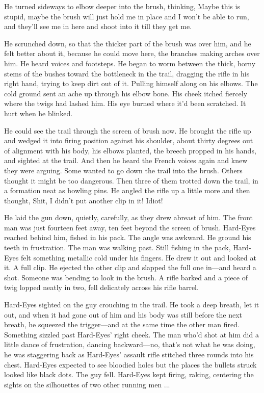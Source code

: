 He turned sideways to elbow deeper into the brush, thinking, Maybe this is stupid, maybe the brush will just hold me in place and I won't be able to run, and they'll see me in here and shoot into it till they get me.

He scrunched down, so that the thicker part of the brush was over him, and he felt better about it, because he could move here, the branches making arches over him. He heard voices and footsteps. He began to worm between the thick, horny stems of the bushes toward the bottleneck in the trail, dragging the rifle in his right hand, trying to keep dirt out of it. Pulling himself along on his elbows. The cold ground sent an ache up through his elbow bone. His cheek itched fiercely where the twigs had lashed him. His eye burned where it'd been scratched. It hurt when he blinked.

He could see the trail through the screen of brush now. He brought the rifle up and wedged it into firing position against his shoulder, about thirty degrees out of alignment with his body, his elbows planted, the breech propped in his hands, and sighted at the trail. And then he heard the French voices again and knew they were arguing. Some wanted to go down the trail into the brush. Others thought it might be too dangerous. Then three of them trotted down the trail, in a formation neat as bowling pins. He angled the rifle up a little more and then thought, Shit, I didn't put another clip in it! Idiot!

He laid the gun down, quietly, carefully, as they drew abreast of him. The front man was just fourteen feet away, ten feet beyond the screen of brush. Hard-Eyes reached behind him, fished in his pack. The angle was awkward. He ground his teeth in frustration. The man was walking past. Still fishing in the pack, Hard-Eyes felt something metallic cold under his fingers. He drew it out and looked at it. A full clip. He ejected the other clip and slapped the full one in—and heard a shot. Someone was bending to look in the brush. A rifle barked and a piece of twig lopped neatly in two, fell delicately across his rifle barrel.

Hard-Eyes sighted on the guy crouching in the trail. He took a deep breath, let it out, and when it had gone out of him and his body was still before the next breath, he squeezed the trigger—and at the same time the other man fired. Something sizzled past Hard-Eyes' right cheek. The man who'd shot at him did a little dance of frustration, dancing backward—no, that's not what he was doing, he was staggering back as Hard-Eyes' assault rifle stitched three rounds into his chest. Hard-Eyes expected to see bloodied holes but the places the bullets struck looked like black dots. The guy fell. Hard-Eyes kept firing, raking, centering the sights on the silhouettes of two other running men ...

